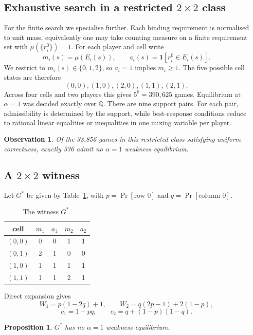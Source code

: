 \documentclass[11pt]{article}
\newtheorem{proposition}[theorem]{Proposition}
\newtheorem{observation}[theorem]{Observation}
\theoremstyle{definition}
\newcommand{\Prob}{\Pr}
\begin{document}
\subsection{Exhaustive search in a restricted $2\times2$ class}
For the finite search we specialise further. Each binding requirement is normalised to unit mass, equivalently one may take counting measure on a finite requirement set with $\mu(\{r_i^0\})=1$. For each player and cell write
\[
m_i(s)=\mu(E_i(s)),\qquad a_i(s)=\mathbf 1[r_i^0\in E_i(s)].
\]
We restrict to $m_i(s)\in\{0,1,2\}$, so $a_i=1$ implies $m_i\ge1$. The five possible cell states are therefore
\[
(0,0),(1,0),(2,0),(1,1),(2,1).
\]
Across four cells and two players this gives $5^8=390{,}625$ games. Equilibrium at $\alpha=1$ was decided exactly over $\mathbb Q$. There are nine support pairs. For each pair, admissibility is determined by the support, while best-response conditions reduce to rational linear equalities or inequalities in one mixing variable per player.

\begin{observation}\label{obs:enum}
Of the 33,856 games in this restricted class satisfying uniform correctness, exactly 336 admit no $\alpha=1$ weakness equilibrium.
\end{observation}

\subsection{A $2\times2$ witness}
Let $G^*$ be given by Table~\ref{tab:witness}, with $p=\Prob[\text{row }0]$ and $q=\Prob[\text{column }0]$.

\begin{table}[h]
\centering
\begin{tabular}{ccccc}
\toprule
cell & $m_1$ & $a_1$ & $m_2$ & $a_2$\\
\midrule
$(0,0)$ & 0 & 0 & 1 & 1\\
$(0,1)$ & 2 & 1 & 0 & 0\\
$(1,0)$ & 1 & 1 & 1 & 1\\
$(1,1)$ & 1 & 1 & 2 & 1\\
\bottomrule
\end{tabular}
\caption{The witness $G^*$.}
\label{tab:witness}
\end{table}

Direct expansion gives
\[
W_1=p(1-2q)+1,
\qquad
W_2=q(2p-1)+2(1-p),
\]
\[
c_1=1-pq,
\qquad
c_2=q+(1-p)(1-q).
\]

\begin{proposition}\label{prop:noexact}
$G^*$ has no $\alpha=1$ weakness equilibrium.
\end{proposition}
\end{document}
